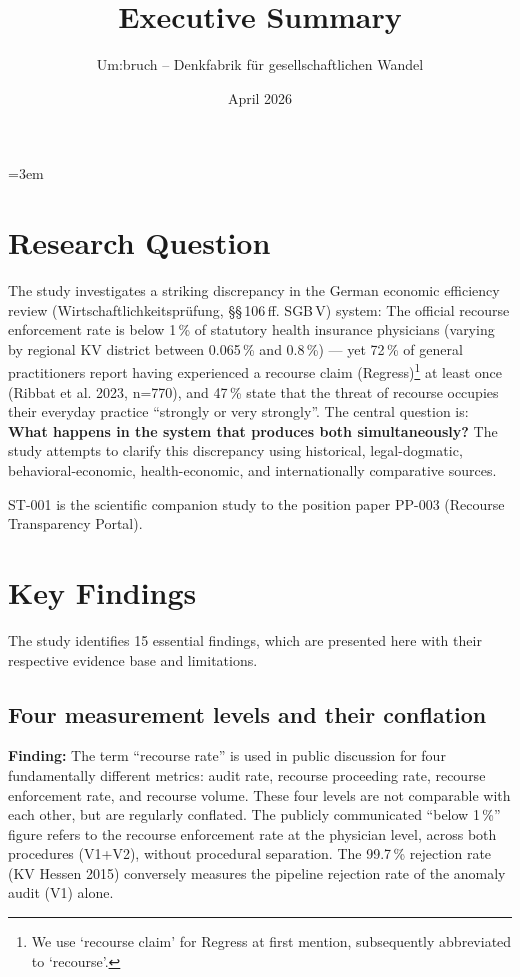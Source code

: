 \documentclass{umbruch-position}
\title{Executive Summary}
\author{Um:bruch -- Denkfabrik f\"ur gesellschaftlichen Wandel}
\date{April 2026}
\providecommand{\textgerman}[1]{#1}
\begin{document}
\emergencystretch=3em
\maketitle

\section{Research Question}

The study investigates a striking discrepancy in the German economic efficiency review (\textgerman{Wirtschaftlichkeitspr\"ufung}, \S\S\,106\,ff. SGB\,V) system: The official recourse enforcement rate is below 1\,\% of statutory health insurance physicians (varying by regional KV district between 0.065\,\% and 0.8\,\%) --- yet 72\,\% of general practitioners report having experienced a recourse claim (\textgerman{Regress})\footnote{We use `recourse claim' for \textgerman{Regress} at first mention, subsequently abbreviated to `recourse'.} at least once (Ribbat et al. 2023, n=770), and 47\,\% state that the threat of recourse occupies their everyday practice ``strongly or very strongly''. The central question is: \textbf{What happens in the system that produces both simultaneously?} The study attempts to clarify this discrepancy using historical, legal-dogmatic, behavioral-economic, health-economic, and internationally comparative sources.

ST-001 is the scientific companion study to the position paper PP-003 (Recourse Transparency Portal).

\section{Key Findings}

The study identifies 15 essential findings, which are presented here with their respective evidence base and limitations.

\subsection{Four measurement levels and their conflation}

\textbf{Finding:} The term ``recourse rate'' is used in public discussion for four fundamentally different metrics: audit rate, recourse proceeding rate, recourse enforcement rate, and recourse volume. These four levels are not comparable with each other, but are regularly conflated. The publicly communicated ``below 1\,\%'' figure refers to the recourse enforcement rate at the physician level, across both procedures (V1+V2), without procedural separation. The 99.7\,\% rejection rate (KV Hessen 2015) conversely measures the pipeline rejection rate of the anomaly audit (V1) alone.
\end{document}
